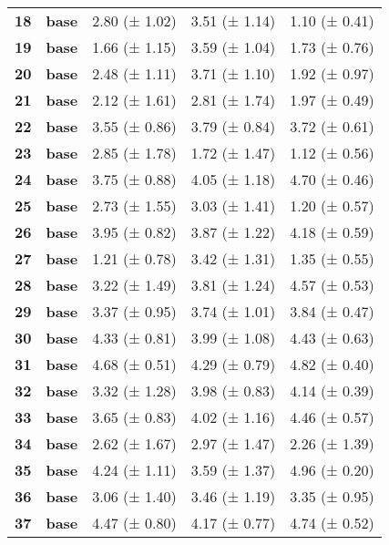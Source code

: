 \begin{longtable}{lllll}
\cline{1-5}
\textbf{18} & \textbf{base} & 2.80 (± 1.02) & 3.51 (± 1.14) & 1.10 (± 0.41) \\
\cline{1-5}
\textbf{19} & \textbf{base} & 1.66 (± 1.15) & 3.59 (± 1.04) & 1.73 (± 0.76) \\
\cline{1-5}
\textbf{20} & \textbf{base} & 2.48 (± 1.11) & 3.71 (± 1.10) & 1.92 (± 0.97) \\
\cline{1-5}
\textbf{21} & \textbf{base} & 2.12 (± 1.61) & 2.81 (± 1.74) & 1.97 (± 0.49) \\
\cline{1-5}
\textbf{22} & \textbf{base} & 3.55 (± 0.86) & 3.79 (± 0.84) & 3.72 (± 0.61) \\
\cline{1-5}
\textbf{23} & \textbf{base} & 2.85 (± 1.78) & 1.72 (± 1.47) & 1.12 (± 0.56) \\
\cline{1-5}
\textbf{24} & \textbf{base} & 3.75 (± 0.88) & 4.05 (± 1.18) & 4.70 (± 0.46) \\
\cline{1-5}
\textbf{25} & \textbf{base} & 2.73 (± 1.55) & 3.03 (± 1.41) & 1.20 (± 0.57) \\
\cline{1-5}
\textbf{26} & \textbf{base} & 3.95 (± 0.82) & 3.87 (± 1.22) & 4.18 (± 0.59) \\
\cline{1-5}
\textbf{27} & \textbf{base} & 1.21 (± 0.78) & 3.42 (± 1.31) & 1.35 (± 0.55) \\
\cline{1-5}
\textbf{28} & \textbf{base} & 3.22 (± 1.49) & 3.81 (± 1.24) & 4.57 (± 0.53) \\
\cline{1-5}
\textbf{29} & \textbf{base} & 3.37 (± 0.95) & 3.74 (± 1.01) & 3.84 (± 0.47) \\
\cline{1-5}
\textbf{30} & \textbf{base} & 4.33 (± 0.81) & 3.99 (± 1.08) & 4.43 (± 0.63) \\
\cline{1-5}
\textbf{31} & \textbf{base} & 4.68 (± 0.51) & 4.29 (± 0.79) & 4.82 (± 0.40) \\
\cline{1-5}
\textbf{32} & \textbf{base} & 3.32 (± 1.28) & 3.98 (± 0.83) & 4.14 (± 0.39) \\
\cline{1-5}
\textbf{33} & \textbf{base} & 3.65 (± 0.83) & 4.02 (± 1.16) & 4.46 (± 0.57) \\
\cline{1-5}
\textbf{34} & \textbf{base} & 2.62 (± 1.67) & 2.97 (± 1.47) & 2.26 (± 1.39) \\
\cline{1-5}
\textbf{35} & \textbf{base} & 4.24 (± 1.11) & 3.59 (± 1.37) & 4.96 (± 0.20) \\
\cline{1-5}
\textbf{36} & \textbf{base} & 3.06 (± 1.40) & 3.46 (± 1.19) & 3.35 (± 0.95) \\
\cline{1-5}
\textbf{37} & \textbf{base} & 4.47 (± 0.80) & 4.17 (± 0.77) & 4.74 (± 0.52) \\

\end{longtable}
